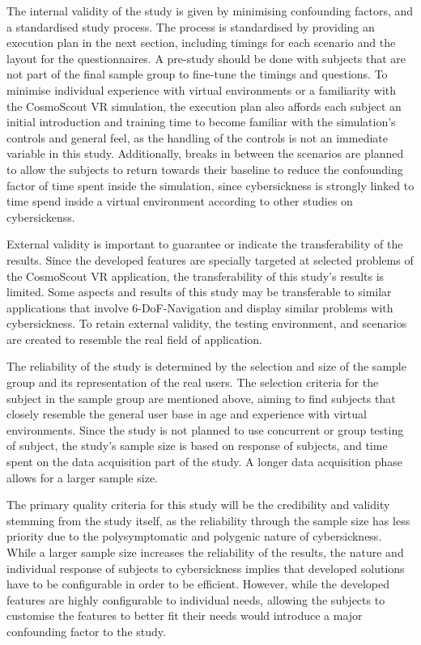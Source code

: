 The internal validity of the study is given by minimising confounding factors, and a standardised study process.
The process is standardised by providing an execution plan in the next section, including timings for each scenario
and the layout for the questionnaires.
A pre-study should be done with subjects that are not part of the final sample group to fine-tune the timings and
questions.
To minimise individual experience with virtual environments or a familiarity with the CosmoScout VR simulation, the
execution plan also affords each subject an initial introduction and training time to become familiar with the
simulation's controls and general feel, as the handling of the controls is not an immediate variable in this study.
Additionally, breaks in between the scenarios are planned to allow the subjects to return towards their baseline to
reduce the confounding factor of time spent inside the simulation, since cybersickness is strongly linked to time
spend inside a virtual environment according to other studies on cybersickenss.

External validity is important to guarantee or indicate the transferability of the results.
Since the developed features are specially targeted at selected problems of the CosmoScout VR application, the
transferability of this study's results is limited.
Some aspects and results of this study may be transferable to similar applications that involve 6-DoF-Navigation and
display similar problems with cybersickness.
To retain external validity, the testing environment, and scenarios are created to resemble the real field of
application.

The reliability of the study is determined by the selection and size of the sample group and its representation of
the real users.
The selection criteria for the subject in the sample group are mentioned above, aiming to find subjects that closely
resemble the general user base in age and experience with virtual environments.
Since the study is not planned to use concurrent or group testing of subject, the study's sample size is based on
response of subjects, and time spent on the data acquisition part of the study.
A longer data acquisition phase allows for a larger sample size.

The primary quality criteria for this study will be the credibility and validity stemming from the study itself, as
the reliability through the sample size has less priority due to the polysymptomatic and polygenic nature of
cybersickness.
While a larger sample size increases the reliability of the results, the nature and individual response of subjects
to cybersickness implies that developed solutions have to be configurable in order to be efficient.
However, while the developed features are highly configurable to individual needs, allowing the subjects to customise
the features to better fit their needs would introduce a major confounding factor to the study.


